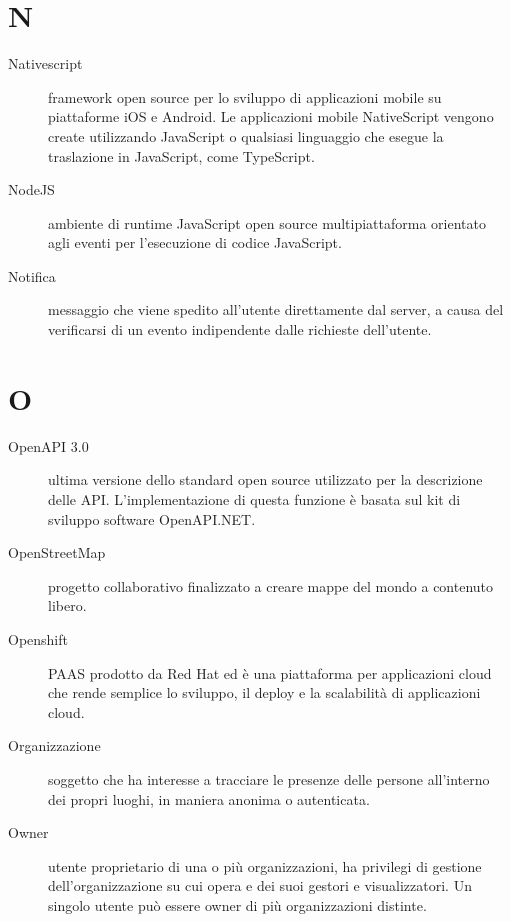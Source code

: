\documentclass{article}
\begin{document}
\section{N}
\begin{description}
  \item[Nativescript] framework open source per lo sviluppo di applicazioni mobile su piattaforme iOS e Android. Le applicazioni mobile NativeScript vengono create utilizzando JavaScript o qualsiasi linguaggio che esegue la traslazione in JavaScript, come TypeScript.
  \item[NodeJS] ambiente di runtime JavaScript open source multipiattaforma orientato agli eventi per l'esecuzione di codice JavaScript.
  \item[Notifica] messaggio che viene spedito all'utente direttamente dal server, a causa del verificarsi di un evento indipendente dalle richieste dell'utente.
\end{description}
\newpage
\section{O}
\begin{description}
  \item[OpenAPI 3.0] ultima versione dello standard open source utilizzato per la descrizione delle API. L’implementazione di questa funzione è basata sul kit di sviluppo software OpenAPI.NET.
  \item[OpenStreetMap] progetto collaborativo finalizzato a creare mappe del mondo a contenuto libero.
  \item[Openshift] PAAS prodotto da Red Hat ed è una piattaforma per applicazioni cloud che rende semplice lo sviluppo, il deploy e la scalabilità di applicazioni cloud.
  \item[Organizzazione] soggetto che ha interesse a tracciare le presenze delle persone all'interno dei propri luoghi, in maniera anonima o autenticata.
  \item[Owner] utente proprietario di una o più organizzazioni, ha privilegi di gestione dell'organizzazione su cui opera e dei suoi gestori e visualizzatori. Un singolo utente può essere owner di più organizzazioni distinte.
\end{description}
\newpage
\end{document}
